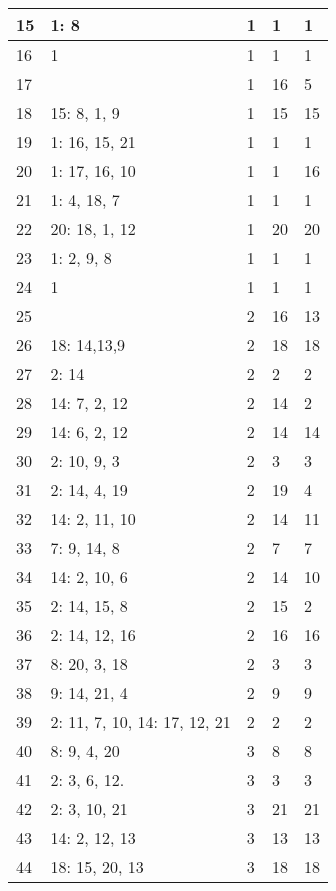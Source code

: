 \documentclass{article} %
\begin{document}
\begin{longtable}{| l | l | l | l | l |}
        15 & 1: 8 & 1 & 1 & 1 \\ \hline
        16 & 1 & 1 & 1 & 1 \\ \hline
        17 &  & 1 & 16 & 5 \\ \hline
        18 & 15: 8, 1, 9 & 1 & 15 & 15 \\ \hline
        19 & 1: 16, 15, 21 & 1 & 1 & 1 \\ \hline
        20 & 1: 17, 16, 10 & 1 & 1 & 16 \\ \hline
        21 & 1: 4, 18, 7 & 1 & 1 & 1 \\ \hline
        22 & 20: 18, 1, 12 & 1 & 20 & 20 \\ \hline
        23 & 1: 2, 9, 8 & 1 & 1 & 1 \\ \hline
        24 & 1 & 1 & 1 & 1 \\ \hline
        25 &  & 2 & 16 & 13 \\ \hline
        26 & 18: 14,13,9 & 2 & 18 & 18 \\ \hline
        27 & 2: 14 & 2 & 2 & 2 \\ \hline
        28 & 14: 7, 2, 12 & 2 & 14 & 2 \\ \hline
        29 & 14: 6, 2, 12 & 2 & 14 & 14 \\ \hline
        30 & 2: 10, 9, 3 & 2 & 3 & 3 \\ \hline
        31 & 2: 14, 4, 19 & 2 & 19 & 4 \\ \hline
        32 & 14: 2, 11, 10 & 2 & 14 & 11 \\ \hline
        33 & 7: 9, 14, 8 & 2 & 7 & 7 \\ \hline
        34 & 14: 2, 10, 6 & 2 & 14 & 10 \\ \hline
        35 & 2: 14, 15, 8 & 2 & 15 & 2 \\ \hline
        36 & 2: 14, 12, 16 & 2 & 16 & 16 \\ \hline
        37 & 8: 20, 3, 18 & 2 & 3 & 3 \\ \hline
        38 & 9: 14, 21, 4 & 2 & 9 & 9 \\ \hline
        39 & 2: 11, 7, 10, 14: 17, 12, 21 & 2 & 2 & 2 \\ \hline
        40 & 8: 9, 4, 20 & 3 & 8 & 8 \\ \hline
        41 & 2: 3, 6, 12. & 3 & 3 & 3 \\ \hline
        42 & 2: 3, 10, 21 & 3 & 21 & 21 \\ \hline
        43 & 14: 2, 12, 13 & 3 & 13 & 13 \\ \hline
        44 & 18: 15, 20, 13 & 3 & 18 & 18 \\ \hline

\end{longtable}
\end{document}
